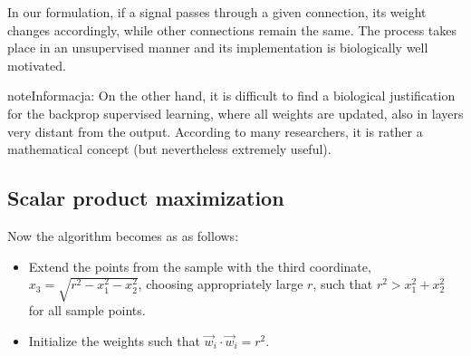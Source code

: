 \documentclass[a4paper,12pt,polish]{jupyterBook}
\begin{document}
\sphinxAtStartPar
In our formulation, if a signal passes through a given connection, its weight changes accordingly, while other connections remain the same. The process takes place in an unsupervised manner and its implementation is biologically well motivated.

\begin{sphinxadmonition}{note}{Informacja:}
\sphinxAtStartPar
On the other hand, it is difficult to find a biological justification for the backprop supervised learning, where all weights are updated, also in layers very distant from the output. According to many researchers, it is rather a mathematical concept (but nevertheless extremely useful).
\end{sphinxadmonition}


\subsection{Scalar product maximization}
\label{\detokenize{docs/unsupervised:scalar-product-maximization}}
\sphinxAtStartPar
Now the algorithm becomes as as follows:
\begin{itemize}
\item {} 
\sphinxAtStartPar
Extend the points from the sample with the third coordinate, \( x_3 = \sqrt {r ^ 2-x_1 ^ 2-x_2 ^ 2} \), choosing appropriately large \( r \), such that \( r ^ 2> x_1 ^ 2 + x_2 ^ 2 \) for all sample points.

\item {} 
\sphinxAtStartPar
Initialize the weights such that \( \vec {w} _i \cdot \vec {w} _i = r ^ 2 \).

\end{itemize}
\end{document}

